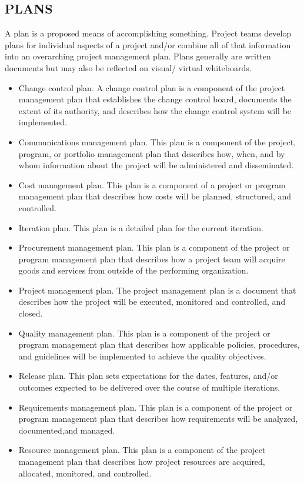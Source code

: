 \documentclass[11pt]{article}
\begin{document}
\subsection{PLANS}
\label{sec:org8ecb7f7}
A plan is a proposed means of accomplishing something. Project teams develop plans for individual aspects of a project and/or combine all of that information into an overarching project management plan. Plans generally are written documents but may also be reflected on visual/ virtual whiteboards.
\begin{itemize}
\item Change control plan. A change control plan is a component of the project management plan that establishes the change control board, documents the extent of its authority, and describes how the change control system will be implemented.
\item Communications management plan. This plan is a component of the project, program, or portfolio management plan that describes how, when, and by whom information about the project will be administered and disseminated.
\item Cost management plan. This plan is a component of a project or program management plan that describes how costs will be planned, structured, and controlled.
\item Iteration plan. This plan is a detailed plan for the current iteration.
\item Procurement management plan. This plan is a component of the project or program management plan that describes how a project team will acquire goods and services from outside of the performing organization.
\item Project management plan. The project management plan is a document that describes how the project will be executed, monitored and controlled, and closed.
\item Quality management plan. This plan is a component of the project or program management plan that describes how applicable policies, procedures, and guidelines will be implemented to achieve the quality objectives.
\item Release plan. This plan sets expectations for the dates, features, and/or outcomes expected to be delivered over the course of multiple iterations.
\item Requirements management plan. This plan is a component of the project or program management plan that describes how requirements will be analyzed, documented,and managed.
\item Resource management plan. This plan is a component of the project management plan that describes how project resources are acquired, allocated, monitored, and controlled.

\end{itemize}
\end{document}
